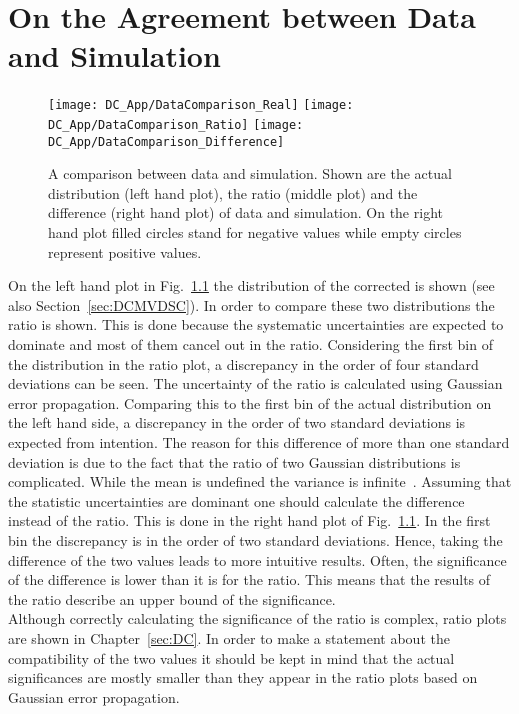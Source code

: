 \chapter{On the Agreement between Data and Simulation \label{sec:DCPvalue}}

\begin{figure}[Hb]
  \centering
  \texttt{[image: DC\_App/DataComparison\_Real]}
  \texttt{[image: DC\_App/DataComparison\_Ratio]}
  \texttt{[image: DC\_App/DataComparison\_Difference]}
\caption[Comparison between data and simulation: Actual distributions, ratio and difference]{A comparison between data and simulation. Shown are the actual distribution (left hand plot), the ratio (middle plot) and the difference (right hand plot) of data and simulation. On the right hand plot filled circles stand for negative values while empty circles represent positive values. \label{plot:DCPvalue}}
\end{figure}

On the left hand plot in Fig.~\ref{plot:DCPvalue} the distribution of the corrected \MET{} is shown (see also Section~\ref{sec:DCMVDSC}). In order to compare these two distributions the ratio is shown. This is done because the systematic uncertainties are expected to dominate and most of them cancel out in the ratio. Considering the first bin of the distribution in the ratio plot, a discrepancy in the order of four standard deviations can be seen. The uncertainty of the ratio is calculated using Gaussian error propagation. Comparing this to the first bin of the actual distribution on the left hand side, a discrepancy in the order of two standard deviations is expected from intention. The reason for this difference of more than one standard deviation is due to the fact that the ratio of two Gaussian distributions is complicated. While the mean is undefined the variance is infinite~\cite{ratioMail}. Assuming that the statistic uncertainties are dominant one should calculate the difference instead of the ratio. This is done in the right hand plot of Fig.~\ref{plot:DCPvalue}. In the first bin the discrepancy is in the order of two standard deviations. Hence, taking the difference of the two values leads to more intuitive results. Often, the significance of the difference is lower than it is for the ratio. This means that the results of the ratio describe an upper bound of the significance. \\
Although correctly calculating the significance of the ratio is complex, ratio plots are shown in Chapter~\ref{sec:DC}. In order to make a statement about the compatibility of the two values it should be kept in mind that the actual significances are mostly smaller than they appear in the ratio plots based on Gaussian error propagation.
